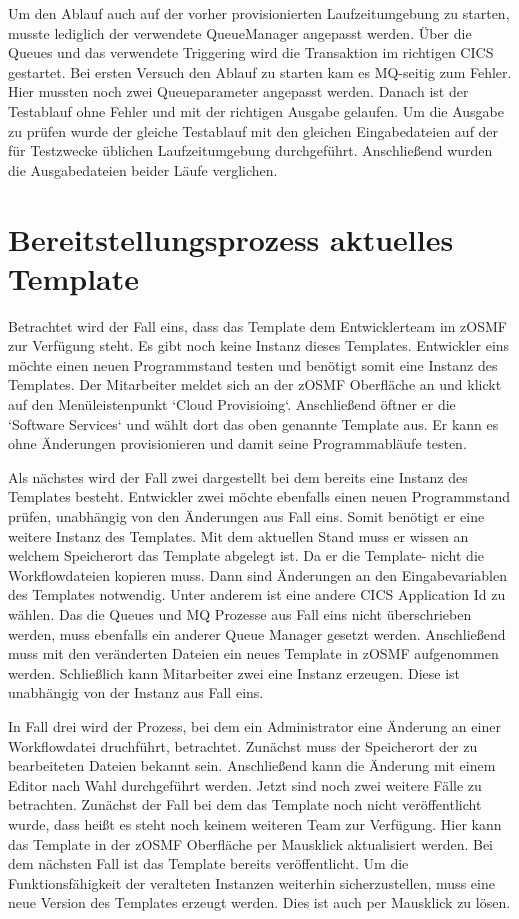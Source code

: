 Um den Ablauf auch auf der vorher provisionierten Laufzeitumgebung zu starten, musste lediglich der verwendete QueueManager angepasst werden.
Über die Queues und das verwendete Triggering wird die Transaktion im richtigen CICS gestartet.
Bei ersten Versuch den Ablauf zu starten kam es MQ-seitig zum Fehler.
Hier mussten noch zwei Queueparameter angepasst werden.
Danach ist der Testablauf ohne Fehler und mit der richtigen Ausgabe gelaufen.
Um die Ausgabe zu prüfen wurde der gleiche Testablauf mit den gleichen Eingabedateien auf der für Testzwecke üblichen Laufzeitumgebung durchgeführt.
Anschließend wurden die Ausgabedateien beider Läufe verglichen.

\section{Bereitstellungsprozess aktuelles Template}\label{sec:akttemp}
Betrachtet wird der Fall eins, dass das Template dem Entwicklerteam im zOSMF zur Verfügung steht.
Es gibt noch keine Instanz dieses Templates.
Entwickler eins möchte einen neuen Programmstand testen und benötigt somit eine Instanz des Templates.
Der Mitarbeiter meldet sich an der zOSMF Oberfläche an und klickt auf den Menüleistenpunkt `Cloud Provisioing`.
Anschließend öftner er die `Software Services` und wählt dort das oben genannte Template aus.
Er kann es ohne Änderungen provisionieren und damit seine Programmabläufe testen.

Als nächstes wird der Fall zwei dargestellt bei dem bereits eine Instanz des Templates besteht.
Entwickler zwei möchte ebenfalls einen neuen Programmstand prüfen, unabhängig von den Änderungen aus Fall eins.
Somit benötigt er eine weitere Instanz des Templates.
Mit dem aktuellen Stand muss er wissen an welchem Speicherort das Template abgelegt ist.
Da er die Template- nicht die Workflowdateien kopieren muss.
Dann sind Änderungen an den Eingabevariablen des Templates notwendig.
Unter anderem ist eine andere CICS Application Id zu wählen.
Das die Queues und MQ Prozesse aus Fall eins nicht überschrieben werden, muss ebenfalls ein anderer Queue Manager gesetzt werden.
Anschließend muss mit den veränderten Dateien ein neues Template in zOSMF aufgenommen werden.
Schließlich kann Mitarbeiter zwei eine Instanz erzeugen.
Diese ist unabhängig von der Instanz aus Fall eins.

In Fall drei wird der Prozess, bei dem ein Administrator eine Änderung an einer Workflowdatei druchführt, betrachtet.
Zunächst muss der Speicherort der zu bearbeiteten Dateien bekannt sein.
Anschließend kann die Änderung mit einem Editor nach Wahl durchgeführt werden.
Jetzt sind noch zwei weitere Fälle zu betrachten.
Zunächst der Fall bei dem das Template noch nicht veröffentlicht wurde, dass heißt es steht noch keinem weiteren Team zur Verfügung.
Hier kann das Template in der zOSMF Oberfläche per Mausklick aktualisiert werden.
Bei dem nächsten Fall ist das Template bereits veröffentlicht.
Um die Funktionsfähigkeit der veralteten Instanzen weiterhin sicherzustellen, muss eine neue Version des Templates erzeugt werden.
Dies ist auch per Mausklick zu lösen.

